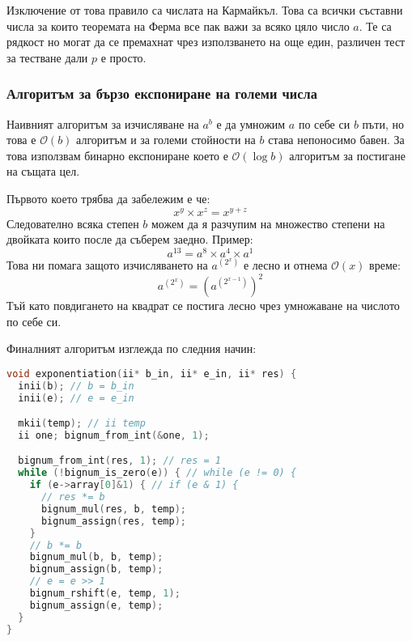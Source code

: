 Изключение от това правило са числата на Кармайкъл. Това са всички съставни числа за които теоремата на Ферма все пак важи за всяко цяло число $a$. Те са рядкост но могат да се премахнат чрез използването на още един, различен тест за тестване дали $p$ е просто.

\subsubsection{Алгоритъм за бързо експониране на големи числа}
Наивният алгоритъм за изчисляване на $a^b$ е да умножим $a$ по себе си $b$ пъти, но това е $\mathcal{O}(b)$ алгоритъм и за големи стойности на $b$ става непоносимо бавен. За това използвам бинарно експониране което е $\mathcal{O}(\log b)$ алгоритъм за постигане на същата цел.

Първото което трябва да забележим е че:
$$ x^y \times x^z = x^{y+z} $$
Следователно всяка степен $b$ можем да я разчупим на множество степени на двойката които после да съберем заедно. Пример:
$$ a^{13} = a^8 \times a^4 \times a^1 $$
Това ни помага защото изчисляването на $a^{(2^x)}$ е лесно и отнема $\mathcal{O}(x)$ време:
$$ a^{(2^x)} = (a^{(2^{x-1})})^2$$
Тъй като повдигането на квадрат се постига лесно чрез умножаване на числото по себе си.

Финалният алгоритъм изглежда по следния начин:
\begin{lstlisting}[language=C]
void exponentiation(ii* b_in, ii* e_in, ii* res) {
  inii(b); // b = b_in
  inii(e); // e = e_in

  mkii(temp); // ii temp
  ii one; bignum_from_int(&one, 1);

  bignum_from_int(res, 1); // res = 1
  while (!bignum_is_zero(e)) { // while (e != 0) {
    if (e->array[0]&1) { // if (e & 1) {
      // res *= b
      bignum_mul(res, b, temp);
      bignum_assign(res, temp);
    }
    // b *= b
    bignum_mul(b, b, temp);
    bignum_assign(b, temp);
    // e = e >> 1
    bignum_rshift(e, temp, 1);
    bignum_assign(e, temp);
  }
}
\end{lstlisting}
